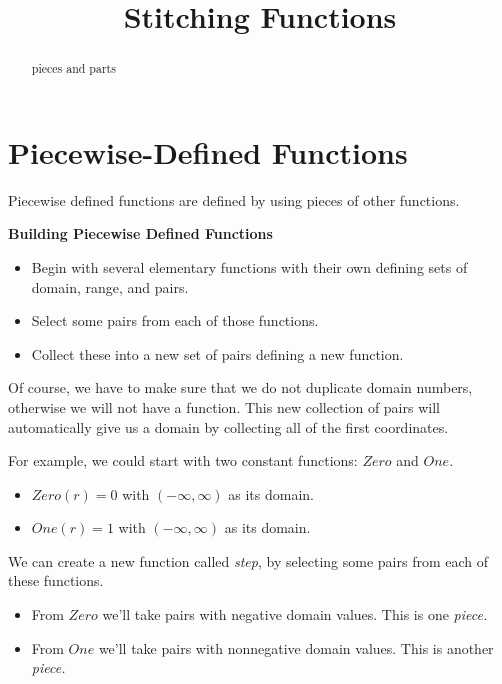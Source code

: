 \documentclass{ximera}
\title{Stitching Functions}
\begin{document}
\begin{abstract}
pieces and parts
\end{abstract}
\maketitle






\section{Piecewise-Defined Functions}

Piecewise defined functions are defined by using pieces of other functions. 


\begin{procedure} \textbf{\textcolor{blue!55!black}{Building Piecewise Defined Functions}} 

\begin{itemize}
\item Begin with several elementary functions with their own defining sets of domain, range, and pairs.  \\
\item Select some pairs from each of those functions. \\
\item Collect these into a new set of pairs defining a new function.  
\end{itemize}

\end{procedure}

Of course, we have to make sure that we do not duplicate domain numbers, otherwise we will not have a function.  This new collection of pairs will automatically give us a domain by collecting all of the first coordinates.

For example, we could start with two constant functions: $Zero$ and $One$.

\begin{itemize}
\item $Zero(r) = 0$ with $(-\infty, \infty)$ as its domain.
\item $One(r) = 1$ with $(-\infty, \infty)$ as its domain.
\end{itemize}

We can create a new function called \textit{step}, by selecting some pairs from each of these functions.  
\begin{itemize}
\item From $Zero$ we'll take pairs with negative domain values. This is one \textit{piece.}
\item From $One$ we'll take pairs with nonnegative domain values. This is another \textit{piece.}
\end{itemize}
\end{document}

